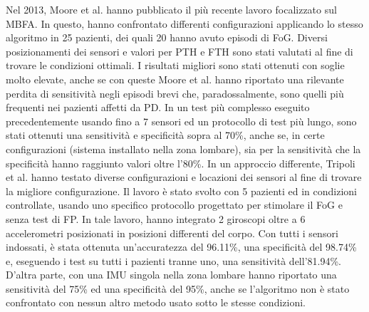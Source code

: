Nel 2013, Moore et al. hanno pubblicato il più recente lavoro focalizzato sul MBFA. In questo, hanno confrontato differenti configurazioni applicando lo stesso algoritmo in 25 pazienti, dei quali 20 hanno avuto episodi di FoG. Diversi posizionamenti dei sensori e valori per PTH e FTH sono stati valutati al fine di trovare le condizioni ottimali. I risultati migliori sono stati ottenuti con soglie molto elevate, anche se con queste Moore et al. hanno riportato una rilevante perdita di sensitività negli episodi brevi che, paradossalmente, sono quelli più frequenti nei pazienti affetti da PD\cite{27}. In un test più complesso eseguito precedentemente\cite{20} usando fino a 7 sensori ed un protocollo di test più lungo, sono stati ottenuti una sensitività e specificità sopra al 70\%, anche se, in certe configurazioni (sistema installato nella zona lombare), sia per la sensitività che la specificità hanno raggiunto valori oltre l'80\%. In un approccio differente, Tripoli et al. hanno testato diverse configurazioni e locazioni dei sensori al fine di trovare la migliore configurazione\cite{52}. Il lavoro è stato svolto con 5 pazienti ed in condizioni controllate, usando uno specifico protocollo progettato per stimolare il FoG e senza test di FP. In tale lavoro, hanno integrato 2 giroscopi oltre a 6 accelerometri posizionati in posizioni differenti del corpo. Con tutti i sensori indossati, è stata ottenuta un'accuratezza del 96.11\%, una specificità del 98.74\% e, eseguendo i test su tutti i pazienti tranne uno, una sensitività dell'81.94\%. D'altra parte, con una IMU singola nella zona lombare hanno riportato una sensitività del 75\% ed una specificità del 95\%, anche se l'algoritmo non è stato confrontato con nessun altro metodo usato sotto le stesse condizioni. \newline
